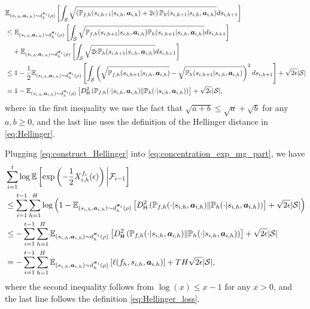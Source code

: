 \begin{align}\label{eq:construct_Hellinger}
    &\mathbb{E}_{(s_{i,h},{\bm{a}}_{i,h})\sim d_h^{{\bm{\pi}}_i}(\rho)}\left[\int_{\mathcal{S}}\sqrt{\left({\mathbb P}_{f,h}(s_{i,h+1}|s_{i,h},{\bm{a}}_{i,h})+2\epsilon\right){\mathbb P}_h(s_{i,h+1}|s_{i,h},{\bm{a}}_{i,h})} ds_{i,h+1}\right]\notag\\
    &\leq \mathbb{E}_{(s_{i,h},{\bm{a}}_{i,h})\sim d_h^{{\bm{\pi}}_i}(\rho)}\left[\int_{\mathcal{S}}\sqrt{{\mathbb P}_{f,h}(s_{i,h+1}|s_{i,h},{\bm{a}}_{i,h}){\mathbb P}_h(s_{i,h+1}|s_{i,h},{\bm{a}}_{i,h})} ds_{i,h+1}\right] \notag\\
    &\quad + \mathbb{E}_{(s_{i,h},{\bm{a}}_{i,h})\sim d_h^{{\bm{\pi}}_i}(\rho)}\left[\int_{\mathcal{S}}\sqrt{2\epsilon{\mathbb P}_h(s_{i,h+1}|s_{i,h},{\bm{a}}_{i,h})} ds_{i,h+1}\right]\notag\\
    &\leq 1-\frac{1}{2}\mathbb{E}_{(s_{i,h},{\bm{a}}_{i,h})\sim d_h^{{\bm{\pi}}_i}(\rho)}\left[\int_{\mathcal{S}}\left(\sqrt{{\mathbb P}_{f,h}(s_{i,h+1}|s_{i,h},{\bm{a}}_{i,h})}-\sqrt{{\mathbb P}_h(s_{i,h+1}|s_{i,h},{\bm{a}}_{i,h})} \right)^2 ds_{i,h+1}\right] + \sqrt{2\epsilon}|{\mathcal{S}}|\notag\\
    &= 1-\mathbb{E}_{(s_{i,h},{\bm{a}}_{i,h})\sim d_h^{{\bm{\pi}}_i}(\rho)}\left[D_{\mathsf{H}}^2\left({\mathbb P}_{f,h}(\cdot|s_{i,h},{\bm{a}}_{i,h})\|{\mathbb P}_h(\cdot|s_{i,h},{\bm{a}}_{i,h})\right)\right] + \sqrt{2\epsilon}|{\mathcal{S}}|,
\end{align}
where in the first inequality we use the fact that $\sqrt{a+b}\leq \sqrt{a}+\sqrt{b}$ for any $a,b\geq 0$, and the last line uses the definition of the Hellinger distance in \eqref{eq:Hellinger}.

Plugging \eqref{eq:construct_Hellinger} into \eqref{eq:concentration_exp_mg_part}, we have
\begin{align*}
    & \sum_{i=1}^t \log\mathbb{E}\left[\exp\left(-\frac{1}{2}X^{f_\epsilon}_{i,h}(\epsilon)\right)\bigg|{\mathcal{F}}_{i-1}\right]\notag\\
    &\leq \sum_{i=1}^{t-1}\sum_{h=1}^H \log \left(1-\mathbb{E}_{(s_{i,h},{\bm{a}}_{i,h})\sim d_h^{{\bm{\pi}}_i}(\rho)}\left[D_{\mathsf{H}}^2\left({\mathbb P}_{f,h}(\cdot|s_{i,h},{\bm{a}}_{i,h})\|{\mathbb P}_h(\cdot|s_{i,h},{\bm{a}}_{i,h})\right)\right] + \sqrt{2\epsilon}|{\mathcal{S}}|\right)\notag\\
    &\leq -\sum_{i=1}^{t-1}\sum_{h=1}^H \mathbb{E}_{(s_{i,h},{\bm{a}}_{i,h})\sim d_h^{{\bm{\pi}}_i}(\rho)}\left[D_{\mathsf{H}}^2\left({\mathbb P}_{f,h}(\cdot|s_{i,h},{\bm{a}}_{i,h})\|{\mathbb P}_h(\cdot|s_{i,h},{\bm{a}}_{i,h})\right)\right] + \sqrt{2\epsilon}|{\mathcal{S}}|\notag\\
    & =-\sum_{i=1}^{t-1}\sum_{h=1}^H \mathbb{E}_{(s_{i,h},{\bm{a}}_{i,h})\sim d_h^{{\bm{\pi}}_i}(\rho)}\left[\ell(f_h,s_{i,h},{\bm{a}}_{i,h})\right]+ TH\sqrt{2\epsilon}|{\mathcal{S}}|,
\end{align*}
where the second inequality follows from $\log(x)\leq x-1$ for any $x>0$, and the last line follows the definition \eqref{eq:Hellinger_loss}.

